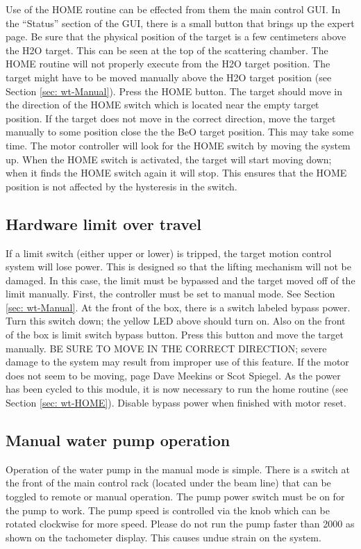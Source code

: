{Use of the HOME routine can be effected from them the main control
GUI. In the {}``Status'' section of the GUI, there is a small button
that brings up the expert page. Be sure that the physical position
of the target is a few centimeters above the H2O target. This can
be seen at the top of the scattering chamber. The HOME routine will
not properly execute from the H2O target position. The target might
have to be moved manually above the H2O target position (see Section
\ref{sec: wt-Manual}). Press the HOME button. The target should move
in the direction of the HOME switch which is located near the empty
target position. If the target does not move in the correct direction,
move the target manually to some position close the the BeO target
position. This may take some time. The motor controller will look
for the HOME switch by moving the system up. When the HOME switch
is activated, the target will start moving down; when it finds the
HOME switch again it will stop. This ensures that the HOME position
is not affected by the hysteresis in the switch.


\subsection{Hardware limit over travel}

If a limit switch (either upper or lower) is tripped, the target motion
control system will lose power. This is designed so that the lifting
mechanism will not be damaged. In this case, the limit must be bypassed
and the target moved off of the limit manually. First, the controller
must be set to manual mode. See Section \ref{sec: wt-Manual}. At the
front of the box, there is a switch labeled bypass power. Turn this
switch down; the yellow LED above should turn on. Also on the front
of the box is limit switch bypass button. Press this button and move
the target manually. BE SURE TO MOVE IN THE CORRECT DIRECTION; severe
damage to the system may result from improper use of this feature.
If the motor does not seem to be moving, page Dave Meekins or Scot
Spiegel. As the power has been cycled to this module, it is now necessary
to run the home routine (see Section \ref{sec: wt-HOME}). Disable bypass
power when finished with motor reset.


\subsection{Manual water pump operation}

Operation of the water pump in the manual mode is simple. There is
a switch at the front of the main control rack (located under the
beam line) that can be toggled to remote or manual operation. The
pump power switch must be on for the pump to work. The pump speed
is controlled via the knob which can be rotated clockwise for more
speed. Please do not run the pump faster than 2000 as shown on the
tachometer display. This causes undue strain on the system.

} %

